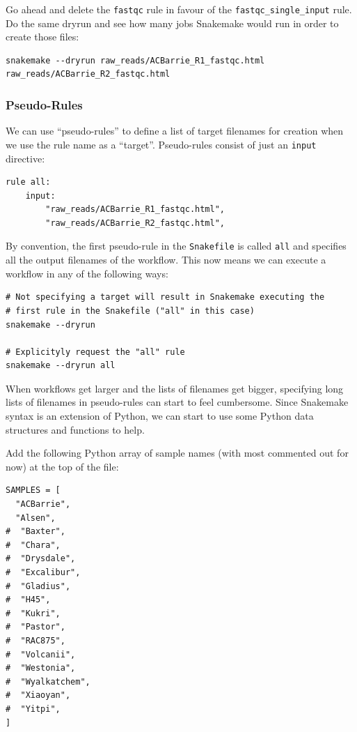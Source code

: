 Go ahead and delete the \texttt{fastqc} rule in favour of the \texttt{fastqc\_single\_input} rule. Do the same dryrun
and see how many jobs Snakemake would run in order to create those files:

\begin{lstlisting}
snakemake --dryrun raw_reads/ACBarrie_R1_fastqc.html raw_reads/ACBarrie_R2_fastqc.html
\end{lstlisting}

\subsubsection{Pseudo-Rules}

We can use ``pseudo-rules'' to define a list of target filenames for creation when we use the rule name as a ``target''. Pseudo-rules consist of just an \texttt{input} directive:

\begin{lstlisting}
rule all:
	input:
		"raw_reads/ACBarrie_R1_fastqc.html",
		"raw_reads/ACBarrie_R2_fastqc.html",
\end{lstlisting}

By convention, the first pseudo-rule in the \texttt{Snakefile} is called \texttt{all} and specifies all the output filenames of the workflow. This now
means we can execute a workflow in any of the following ways:

\begin{lstlisting}
# Not specifying a target will result in Snakemake executing the
# first rule in the Snakefile ("all" in this case)
snakemake --dryrun

# Explicityly request the "all" rule
snakemake --dryrun all
\end{lstlisting}

When workflows get larger and the lists of filenames get bigger, specifying long lists of filenames in pseudo-rules can start to feel cumbersome.
Since Snakemake syntax is an extension of Python, we can start to use some Python data structures and functions to help.

Add the following Python array of sample names (with most commented out for now) at the top of the file:

\begin{lstlisting}
SAMPLES = [
  "ACBarrie",
  "Alsen",
#  "Baxter",
#  "Chara",
#  "Drysdale",
#  "Excalibur",
#  "Gladius",
#  "H45",
#  "Kukri",
#  "Pastor",
#  "RAC875",
#  "Volcanii",
#  "Westonia",
#  "Wyalkatchem",
#  "Xiaoyan",
#  "Yitpi",
]
\end{lstlisting}

